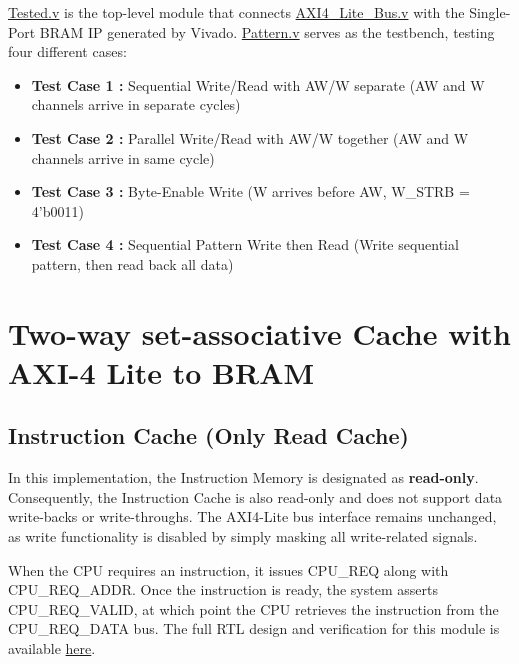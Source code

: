 \documentclass[12pt,a4paper]{report}
\begin{document}
\href{https://github.com/akira2963753/Pipelined-RV32-SoC/blob/main/I-CACHE/AXI4-LITE/Tested.v}{Tested.v} is the top-level module that connects \href{https://github.com/akira2963753/Pipelined-RV32-SoC/blob/main/I-CACHE/AXI4-LITE/AXI4_Lite_Bus.v}{AXI4\_Lite\_Bus.v} with the Single-Port BRAM IP generated by Vivado. \href{https://github.com/akira2963753/Pipelined-RV32-SoC/blob/main/I-CACHE/AXI4-LITE/Pattern.v}{Pattern.v} serves as the testbench, testing four different cases:

\begin{itemize}
    \item \textbf{Test Case 1 :} Sequential Write/Read with AW/W separate (AW and W channels arrive in separate cycles)
    \item \textbf{Test Case 2 :} Parallel Write/Read with AW/W together (AW and W channels arrive in same cycle)
    \item \textbf{Test Case 3 :} Byte-Enable Write (W arrives before AW, W\_STRB = 4'b0011)
    \item \textbf{Test Case 4 :} Sequential Pattern Write then Read (Write sequential pattern, then read back all data)
\end{itemize}

\newpage

\section{Two-way set-associative Cache with AXI-4 Lite to BRAM}

\subsection{Instruction Cache (Only Read Cache)}
\label{subsec:instruction_cache}
In this implementation, the Instruction Memory is designated as \textbf{read-only}. Consequently, the Instruction Cache is also read-only and does not support data write-backs or write-throughs. The AXI4-Lite bus interface remains unchanged, as write functionality is disabled by simply masking all write-related signals.

When the CPU requires an instruction, it issues CPU\_REQ along with CPU\_REQ\_ADDR. Once the instruction is ready, the system asserts CPU\_REQ\_VALID, at which point the CPU retrieves the instruction from the CPU\_REQ\_DATA bus. The full RTL design and verification for this module is available \href{https://github.com/akira2963753/Pipelined-RV32-SoC/tree/main/CACHE/I-CACHE}{here}.
\end{document}
